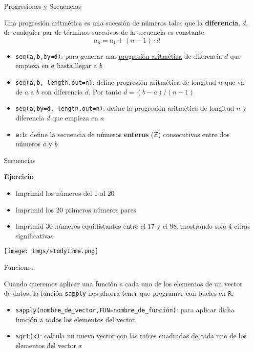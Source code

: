 \documentclass[
  ignorenonframetext,
]{beamer}
\providecommand{\tightlist}{%
  \setlength{\itemsep}{0pt}\setlength{\parskip}{0pt}}
\begin{document}
\begin{frame}[fragile]{Progresiones y Secuencias}
\protect\hypertarget{progresiones-y-secuencias}{}

Una progresión aritmética es una sucesión de números tales que la
\textbf{diferencia}, \(d\), de cualquier par de términos sucesivos de la
secuencia es constante. \[a_n = a_1 + (n-1)\cdot d\]

\begin{itemize}
\tightlist
\item
  \texttt{seq(a,b,by=d)}: para generar una
  \href{https://es.wikipedia.org/wiki/Progresión_aritmética}{progresión
  aritmética} de diferencia \(d\) que empieza en \(a\) hasta llegar a
  \(b\)
\item
  \texttt{seq(a,b,\ length.out=n)}: define progresión aritmética de
  longitud \(n\) que va de \(a\) a \(b\) con diferencia \(d\). Por tanto
  \(d=(b-a)/(n-1)\)
\item
  \texttt{seq(a,by=d,\ length.out=n)}: define la progresión aritmética
  de longitud \(n\) y diferencia \(d\) que empieza en \(a\)
\item
  \texttt{a:b}: define la secuencia de números \textbf{enteros}
  (\(\mathbb{Z}\)) consecutivos entre dos números \(a\) y \(b\)
\end{itemize}

\end{frame}

\begin{frame}{Secuencias}
\protect\hypertarget{secuencias}{}

\textbf{Ejercicio}

\begin{itemize}
\tightlist
\item
  Imprimid los números del 1 al 20 
\item
  Imprimid los 20 primeros números pares 
\item
  Imprimid 30 números equidistantes entre el 17 y el 98, mostrando solo
  4 cifras significativas 
\end{itemize}

\texttt{[image: Imgs/studytime.png]}

\end{frame}

\begin{frame}[fragile]{Funciones}
\protect\hypertarget{funciones}{}

Cuando queremos aplicar una función a cada uno de los elementos de un
vector de datos, la función \texttt{sapply} nos ahorra tener que
programar con bucles en \texttt{R}:

\begin{itemize}
\tightlist
\item
  \texttt{sapply(nombre\_de\_vector,FUN=nombre\_de\_función)}: para
  aplicar dicha función a todos los elementos del vector
\item
  \texttt{sqrt(x)}: calcula un nuevo vector con las raíces cuadradas de
  cada uno de los elementos del vector \(x\)
\end{itemize}

\end{frame}
\end{document}
